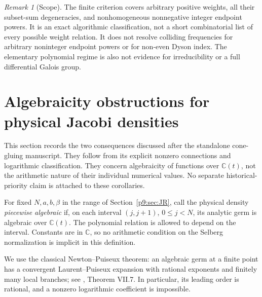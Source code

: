 \documentclass[11pt,a4paper]{article}
\theoremstyle{definition}
\theoremstyle{remark}
\newtheorem{remark}[theorem]{Remark}
\newcommand{\C}{\mathbb C}
\numberwithin{equation}{section}
\begin{document}
\begin{remark}[Scope]
The finite criterion covers arbitrary positive weights, all their
subset-sum degeneracies, and nonhomogeneous nonnegative integer
endpoint powers.  It is an exact algorithmic classification, not a
short combinatorial list of every possible weight relation.  It
does not resolve colliding frequencies for arbitrary noninteger
endpoint powers or for non-even Dyson index.  The elementary
polynomial regime is also not evidence for irreducibility or a full
differential Galois group.
\end{remark}


\section{Algebraicity obstructions for physical Jacobi densities}
\label{p9:alg:section}

This section records the two consequences discussed after the standalone
cone-gluing manuscript. They follow from its explicit nonzero connections
and logarithmic classification. They concern algebraicity of functions
over $\C(t)$, not the arithmetic nature of their individual numerical
values. No separate historical-priority claim is attached to these
corollaries.

For fixed $N,a,b,\beta$ in the range of Section~\ref{p9:sec:JR}, call the
physical density \emph{piecewise algebraic} if, on each interval
$(j,j+1)$, $0\le j<N$, its analytic germ is algebraic over $\C(t)$.
The polynomial relation is allowed to depend on the interval. Constants
are in $\C$, so no arithmetic condition on the Selberg normalization is
implicit in this definition.

We use the classical Newton--Puiseux theorem: an algebraic germ at a finite
point has a convergent Laurent--Puiseux expansion with rational exponents
and finitely many local branches; see \cite{p9:FSAnalytic}, Theorem VII.7.
In particular, its leading order is rational, and a nonzero logarithmic
coefficient is impossible.
\end{document}
